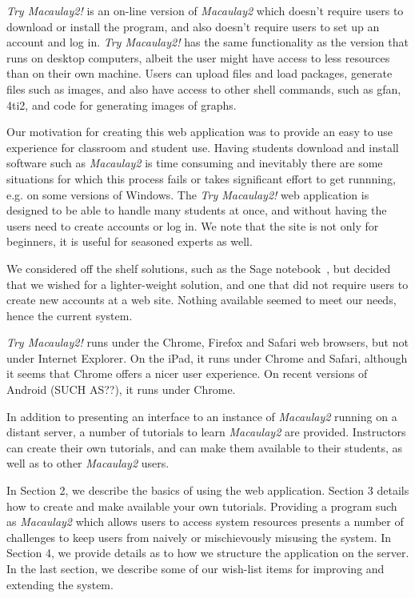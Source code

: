 \documentclass[]{article}
\def\tryM2{{\it Try Macaulay2!}}
\def\M2{{\it Macaulay2}}
\begin{document}
\tryM2 is an on-line version of \M2 which
doesn't require users to download or install the program, and also
doesn't require users to set up an account and log in.  \tryM2
has the same functionality as the version that runs on
desktop computers, albeit the user might have access to less resources
than on their own machine.  Users can upload files and
load packages, generate files such as images, and also have
access to other shell commands, such as gfan, 4ti2, and code for
generating images of graphs.

Our motivation for creating this web application was to provide an
easy to use experience for classroom and student use.  Having students
download and install software such as \M2 is time
consuming and inevitably there are some situations for which this
process fails or takes significant effort to get runnning, e.g. on
some versions of Windows.  The \tryM2 web application is
designed to be able to handle many students at once, and without
having the users need to create accounts or log in.  We note that the
site is not only for beginners, it is useful for seasoned experts as
well.

We considered off the shelf solutions, such as the Sage
notebook~\cite{sagenotebook}, but decided that we wished for a
lighter-weight solution, and one that did not require users to create
new accounts at a web site.  Nothing available seemed to meet our
needs, hence the current system.

\tryM2 runs under the Chrome, Firefox and Safari web browsers, but not
under Internet Explorer.  On the iPad, it runs under Chrome and
Safari, although it seems that Chrome offers a nicer user experience.
On recent versions of Android (SUCH AS??), it runs under Chrome.

In addition to presenting an interface to an instance of \M2
running on a distant server, a number of tutorials to
learn \M2 are provided.  Instructors can create their own
tutorials, and can make them available to their students, as well as
to other \M2 users.  

In Section 2, we describe the basics of using the web application.
Section 3 details how to create and make available your own tutorials.
Providing a program such as \M2 which allows users to
access system resources presents a number of challenges to keep users
from naively or mischievously misusing the system.  In Section 4, we
provide details as to how we structure the application on the server.
In the last section, we describe some of our wish-list items for
improving and extending the system.
\end{document}

